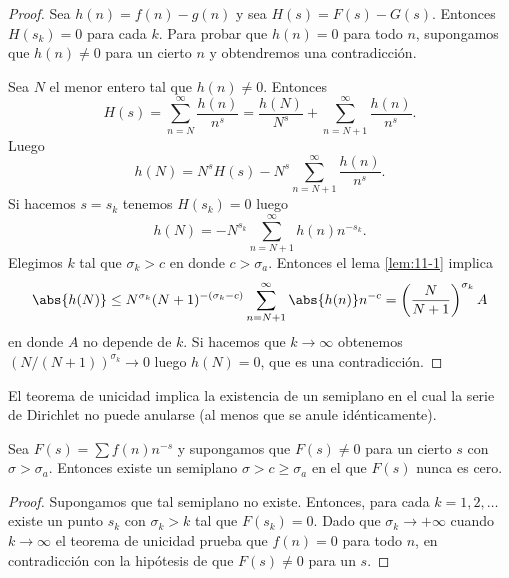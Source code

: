 \documentclass[12pt,a4paper]{book}
\begin{document}
    \begin{proof}
        Sea $h(n)=f(n)-g(n)$ y sea $H(s)=F(s)-G(s)$. Entonces $H(s_{k})=0$ para cada $k$. Para
        probar que $h(n)=0$ para todo $n$, supongamos que $h(n)\neq0$ para un cierto $n$ y
        obtendremos una contradicción.

        Sea $N$ el menor entero tal que $h(n)\neq0$. Entonces
        \begin{equation*}
            H(s)=\sum_{n=N}^{\infty}\frac{h(n)}{n^{s}}=\frac{h(N)}{N^{s}}+\sum_{n=N+1}^{\infty}\frac{h(n)}{n^{s}}.
        \end{equation*}
        Luego
        \begin{equation*}
            h(N)=N^{s}H(s)-N^{s}\sum_{n=N+1}^{\infty}\frac{h(n)}{n^{s}}.
        \end{equation*}
        Si hacemos $s=s_{k}$ tenemos $H(s_{k})=0$ luego
        \begin{equation*}
            h(N)=-N^{s_{k}}\sum_{n=N+1}^{\infty}h(n)n^{-s_{k}}.
        \end{equation*}
        Elegimos $k$ tal que $\sigma_{k}>c$ en donde $c>\sigma_{a}$. Entonces el lema
        \ref{lem:11-1} implica
        \begin{equation*}
            \abs{h(N)}\leq N^{\sigma_{k}}(N+1)^{-(\sigma_{k}-c)}\sum_{n=N+1}^{\infty}\abs{h(n)}n^{-c}=\left(\frac{N}{N+1}\right)^{\sigma_{k}}A
        \end{equation*}
        en donde $A$ no depende de $k$. Si hacemos que $k\to\infty$ obtenemos
        $(N/(N+1))^{\sigma_{k}}\to0$ luego $h(N)=0$, que es una contradicción.
    \end{proof}

    El teorema de unicidad implica la existencia de un semiplano en el cual la serie de
    Dirichlet no puede anularse (al menos que se anule idénticamente).

    \begin{teorema}\label{teo:11-4}
        Sea $F(s)=\sum f(n)n^{-s}$ y supongamos que $F(s)\neq0$ para un cierto $s$ con
        $\sigma>\sigma_{a}$. Entonces existe un semiplano $\sigma>c\geq\sigma_{a}$ en el que
        $F(s)$ nunca es cero.
    \end{teorema}

    \begin{proof}
        Supongamos que tal semiplano no existe. Entonces, para cada $k=1,2,\dots$ existe un
        punto $s_{k}$ con $\sigma_{k}>k$ tal que $F(s_{k})=0$. Dado que $\sigma_{k}\to+\infty$ cuando
        $k\to\infty$ el teorema de unicidad prueba que $f(n)=0$ para todo $n$, en
        contradicción con la hipótesis de que $F(s)\neq0$ para un $s$.
    \end{proof}
\end{document}
